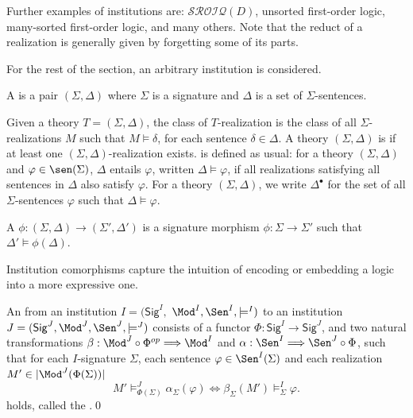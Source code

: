 \documentclass[10pt, a4paper]{isov2}
\newcommand{\Sig}{\mathsf{Sig}}
\begin{document}
Further examples of institutions are: $\mathcal{SROIQ}(D)$, unsorted first-order logic,
many-sorted first-order logic, and many others.  Note that the reduct of a realization
is generally given by forgetting some of its parts.

For the rest of the section, an arbitrary institution is considered.

\begin{definition}[Theory]
A  is a pair $(\Sigma,\Delta)$ where $\Sigma$ is a signature and $\Delta$ is a set of $\Sigma$-sentences.
\end{definition}

Given a theory $T=(\Sigma, \Delta)$, the class of $T$-realization
is the class of all
$\Sigma$-realizations $M$ such that $M\models \delta$,
for each sentence $\delta \in \Delta$.
A theory $(\Sigma, \Delta)$ is  if at least one
 $(\Sigma, \Delta)$-realization exists.
  is defined as usual:
for  a theory $(\Sigma, \Delta)$ and
$\varphi\in \sen(\Sigma)$, $\Delta$ entails $\varphi$, written $\Delta\models\varphi$, if all realizations satisfying all sentences in
$\Delta$ also satisfy $\varphi$. For a theory $(\Sigma, \Delta)$, we write $\Delta^\bullet$ for the set of all $\Sigma$-sentences $\varphi$ such that $\Delta \models \varphi$.

\begin{definition}
A  $\phi: (\Sigma, \Delta) \rightarrow (\Sigma',  \Delta')$ is
   a signature morphism $\phi:\Sigma\rightarrow \Sigma'$ such that $\Delta'\models \phi(\Delta)$.
\end{definition}
\medskip

Institution comorphisms capture the intuition of encoding or embedding a logic into a more expressive one.

\begin{definition} An  from an institution $I = (\Sig^I,$ $ \Mod^I, \Sen^I, \models^I)$ to an institution $J=(\Sig^J, \Mod^J,\Sen^J, \models^J)$ consists of a functor $\Phi : \Sig^I \longrightarrow \Sig^J$, and
two natural transformations $\beta: \Mod^J \circ \Phi^{op} \Longrightarrow \Mod^I$
and $\alpha: \Sen^I \Longrightarrow \Sen^J \circ \Phi$, such that
for each $I$-signature $\Sigma$, each sentence $\varphi\in\Sen^I(\Sigma)$ and each realization $M'\in|\Mod^J(\Phi(\Sigma))|$
%
\begin{equation*}
  M'\models^{J}_{\Phi(\Sigma)}\alpha_{\Sigma}(\varphi)
\iff
  \beta_{\Sigma}(M')\models^I_{\Sigma}\varphi.
\end{equation*}
%
holds, called the .\quad\qed
\end{definition}
\end{document}
